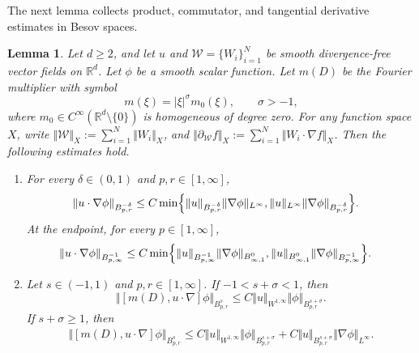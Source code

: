 \documentclass[reqno,11pt,a4paper]{amsart}
\newtheorem{lemma}[theorem]{Lemma}
\begin{document}
The next lemma collects product, commutator,
and tangential derivative estimates in Besov spaces.
\begin{lemma}\label{lem:CMX2.5}
Let $d\geq2$, and let $u$ and
$\mathcal W=\{W_i\}_{i=1}^N$
be smooth divergence-free vector fields on $\mathbb R^d$.
Let $\phi$ be a smooth scalar function.
Let $m(D)$ be the Fourier multiplier with symbol
\[
  m(\xi)=|\xi|^\sigma m_0(\xi),
  \qquad \sigma>-1,
\]
where $m_0\in C^\infty(\mathbb R^d\setminus\{0\})$
is homogeneous of degree zero.
For any function space $X$, write
$\Vert \mathcal W\Vert _X:=\sum_{i=1}^N\Vert W_i\Vert _X$,
and $\Vert \partial_{\mathcal W}f\Vert _X :=\sum_{i=1}^N\Vert W_i\cdot\nabla f\Vert _X$.
Then the following estimates hold.

\begin{enumerate}[(1)]
\item
For every $\delta\in(0,1)$ and $p,r\in[1,\infty]$,
\begin{equation}\label{eq:prodBes}
\begin{aligned}
  \Vert u\cdot\nabla\phi\Vert _{B^{-\delta}_{p,r}}
  \leq C\min\Bigl\{
    &\Vert u\Vert _{B^{-\delta}_{p,r}}\Vert \nabla\phi\Vert _{L^\infty},
    \Vert u\Vert _{L^\infty}
      \Vert \nabla\phi\Vert _{B^{-\delta}_{p,r}}
  \Bigr\}.
\end{aligned}
\end{equation}
At the endpoint, for every $p\in[1,\infty]$,
\begin{equation}\label{eq:prodBes-endp}
\begin{aligned}
  \Vert u\cdot\nabla\phi\Vert _{B^{-1}_{p,\infty}}
  \leq C\min\Bigl\{
    &\Vert u\Vert _{B^{-1}_{p,\infty}}
      \Vert \nabla\phi\Vert _{B^0_{\infty,1}},
    \Vert u\Vert _{B^0_{\infty,1}}
      \Vert \nabla\phi\Vert _{B^{-1}_{p,\infty}}
  \Bigr\}.
\end{aligned}
\end{equation}

\item
Let $s\in(-1,1)$ and $p,r\in[1,\infty]$.
If $-1<s+\sigma<1$, then
\begin{equation}\label{eq:commEs}
  \Vert [m(D),u\cdot\nabla]\phi\Vert _{B^s_{p,r}}
  \leq C\Vert u\Vert _{W^{1,\infty}}
  \Vert \phi\Vert _{B^{s+\sigma}_{p,r}}.
\end{equation}
If $s+\sigma\geq1$, then
\begin{equation}\label{eq:commEs2}
\begin{aligned}
  \Vert [m(D),u\cdot\nabla]\phi\Vert _{B^s_{p,r}}
  \leq {}
  C\Vert u\Vert _{W^{1,\infty}}
  \Vert \phi\Vert _{B^{s+\sigma}_{p,r}}
  +C\Vert u\Vert _{B^{s+\sigma}_{p,r}}
  \Vert \nabla\phi\Vert _{L^\infty}.
\end{aligned}
\end{equation}


\end{enumerate}
\end{lemma}
\end{document}
